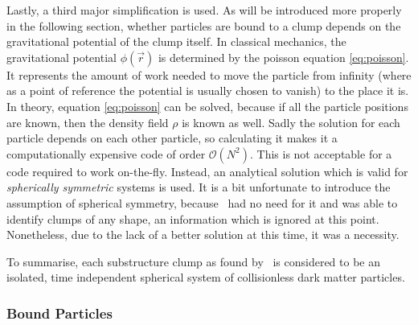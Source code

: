 Lastly, a third major simplification is used.
As will be introduced more properly in the following section, whether particles are bound to a clump depends on the gravitational potential of the clump itself.
In classical mechanics, the gravitational potential $\phi(\vec{r})$ is determined by the poisson equation \ref{eq:poisson}.
It represents the amount of work needed to move the particle from infinity (where as a point of reference the potential is usually chosen to vanish) to the place it is.\\
%
In theory, equation \ref{eq:poisson} can be solved, because if all the particle positions are known, then the density field $\rho$ is known as well.
Sadly the solution for each particle depends on each other particle, so calculating it makes it a computationally expensive code of order $\mathcal{O}(N^2)$.
This is not acceptable for a code required to work on-the-fly.
Instead, an analytical solution which is valid for \emph{spherically symmetric} systems is used.
It is a bit unfortunate to introduce the assumption of spherical symmetry, because \phew\ had no need for it and was able to identify clumps of any shape, an information which is ignored at this point.
Nonetheless, due to the lack of a better solution at this time, it was a necessity.





To summarise, each substructure clump as found by \phew\ is considered to be an isolated, time independent spherical system of collisionless dark matter particles.



















\subsubsection{Bound Particles}

